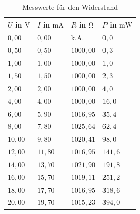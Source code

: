         \begin{table}[ht!]
            \centering
            \begin{tabular}{|l|l|l|l|}
                \hline
                $U$ in $\mathrm{V}$ & $I$ in $\mathrm{mA}$ & $R$ in $\mathrm{\Omega}$ & $P$ in $\mathrm{mW}$\\
                \hline\hline
                $0,00$ & $0,00$ & k.A. & $0,0$\\
                \hline
                $0,50$ & $0,50$ & $1000,00$ & $0,3$\\
                \hline
                $1,00$ & $1,00$ & $1000,00$ & $1,0$\\
                \hline
                $1,50$ & $1,50$ & $1000,00$ & $2,3$\\
                \hline
                $2,00$ & $2,00$ & $1000,00$ & $4,0$\\
                \hline
                $4,00$ & $4,00$ & $1000,00$ & $16,0$\\
                \hline
                $6,00$ & $5,90$ & $1016,95$ & $35,4$\\
                \hline
                $8,00$ & $7,80$ & $1025,64$ & $62,4$\\
                \hline
                $10,00$ & $9,80$ & $1020,41$ & $98,0$\\
                \hline
                $12,00$ & $11,80$ & $1016,95$ & $141,6$\\
                \hline
                $14,00$ & $13,70$ & $1021,90$ & $191,8$\\
                \hline
                $16,00$ & $15,70$ & $1019,11$ & $251,2$\\
                \hline
                $18,00$ & $17,70$ & $1016,95$ & $318,6$\\
                \hline
                $20,00$ & $19,70$ & $1015,23$ & $394,0$\\
                \hline
            \end{tabular}
            \caption{Messwerte für den Widerstand}
            \label{tab:widerstand}
        \end{table}

